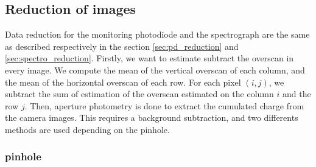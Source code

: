 %
% 
%

\subsection{Reduction of images}
\label{sec:photometry}

Data reduction for the monitoring photodiode and the spectrograph are the same as described respectively in the section \ref{sec:pd_reduction} and \ref{sec:spectro_reduction}. Firstly, we want to estimate subtract the overscan in every image. We compute the mean of the vertical overscan of each column, and the mean of the horizontal overscan of each row. For each pixel $(i, j)$, we subtract the sum of estimation of the overscan estimated on the column $i$ and the row $j$.
Then, aperture photometry is done to extract the cumulated charge from the \SD camera images.  This requires a background subtraction, and two differents methods are used depending on the pinhole.

\subsubsection{\spinhole pinhole}

